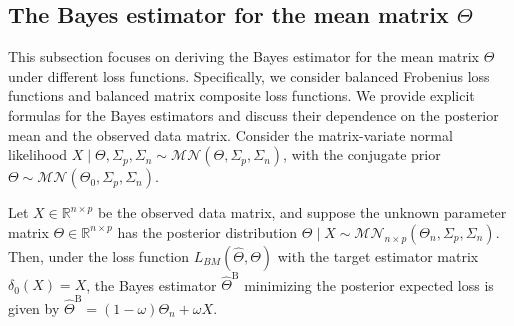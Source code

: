 \documentclass[twoside]{article}
\begin{document}
\subsection{The Bayes estimator for the mean matrix $\Theta$}
This subsection focuses on deriving the Bayes estimator for the mean matrix $\Theta$ under different loss functions. Specifically, we consider balanced Frobenius loss functions and balanced matrix composite loss functions. We provide explicit formulas for the Bayes estimators and discuss their dependence on the posterior mean and the observed data matrix.
Consider the matrix-variate normal likelihood $X \mid \Theta, \Sigma_p, \Sigma_n \sim \mathcal{MN}(\Theta, \Sigma_p, \Sigma_n)$, with the conjugate prior $\Theta \sim \mathcal{MN}(\Theta_0, \Sigma_p, \Sigma_n)$.
\begin{thm}\label{t32}
Let $X \in \mathbb{R}^{n \times p}$ be the observed data matrix, and suppose the unknown parameter matrix $\Theta \in \mathbb{R}^{n \times p}$ has the posterior distribution $\Theta \mid X \sim \mathcal{MN}_{n \times p}(\Theta_n, \Sigma_p, \Sigma_n)$. Then, under the loss function $L_{BM}(\hat{\Theta}, \Theta)$ with the target estimator matrix $\delta_0(X)= X$, the Bayes estimator $\hat{\Theta}^{\mathrm{B}}$ minimizing the posterior expected loss is given by $\hat{\Theta}^{\mathrm{B}} = (1-\omega) \Theta_n + \omega X$.
\end{thm}
\end{document}
